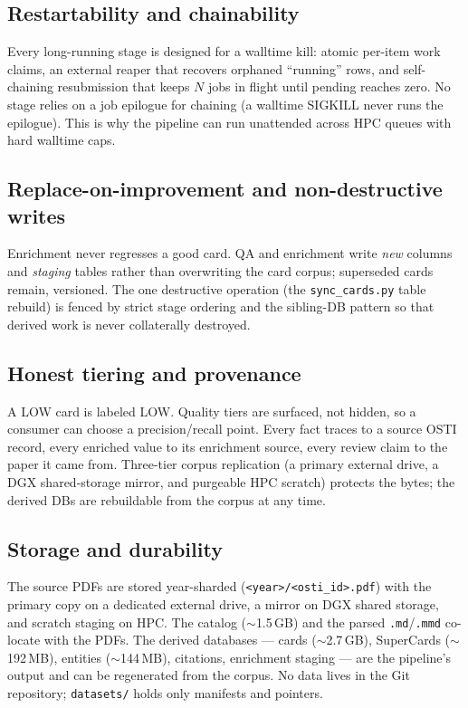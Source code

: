\documentclass[11pt,letterpaper]{article}
\newcommand{\code}[1]{\texttt{\small #1}}
\begin{document}
\subsection{Restartability and chainability}

Every long-running stage is designed for a walltime kill: atomic per-item work
claims, an external reaper that recovers orphaned ``running'' rows, and self-chaining
resubmission that keeps $N$ jobs in flight until pending reaches zero. No stage
relies on a job epilogue for chaining (a walltime SIGKILL never runs the epilogue).
This is why the pipeline can run unattended across HPC queues with hard walltime
caps.

\subsection{Replace-on-improvement and non-destructive writes}

Enrichment never regresses a good card. QA and enrichment write \emph{new} columns
and \emph{staging} tables rather than overwriting the card corpus; superseded cards
remain, versioned. The one destructive operation (the \code{sync\_cards.py} table
rebuild) is fenced by strict stage ordering and the sibling-DB pattern so that
derived work is never collaterally destroyed.

\subsection{Honest tiering and provenance}

A LOW card is labeled LOW. Quality tiers are surfaced, not hidden, so a consumer can
choose a precision/recall point. Every fact traces to a source OSTI record, every
enriched value to its enrichment source, every review claim to the paper it came
from. Three-tier corpus replication (a primary external drive, a DGX shared-storage
mirror, and purgeable HPC scratch) protects the bytes; the derived DBs are
rebuildable from the corpus at any time.

\subsection{Storage and durability}
\label{sec:storage}

The source PDFs are stored year-sharded (\code{<year>/<osti\_id>.pdf}) with the
primary copy on a dedicated external drive, a mirror on DGX shared storage, and
scratch staging on HPC. The catalog ($\sim$1.5\,GB) and the parsed \code{.md}/\code{.mmd}
co-locate with the PDFs. The derived databases --- cards ($\sim$2.7\,GB), SuperCards
($\sim$192\,MB), entities ($\sim$144\,MB), citations, enrichment staging --- are the
pipeline's output and can be regenerated from the corpus. No data lives in the Git
repository; \code{datasets/} holds only manifests and pointers.
\end{document}
